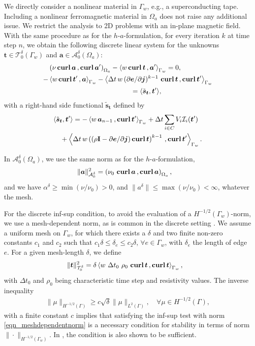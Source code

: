 \documentclass[journal]{IEEEtran}
\renewcommand{\vec}[1]{\boldsymbol{#1}} %
\newcommand{\mat}[1]{\mathbf{#1}} %
\newcommand{\paren}[1]{\left(#1\right)}
\newcommand{\parenangle}[1]{\left\langle#1\right\rangle}
\newcommand{\volInt}[3]{\paren{#1 \, , #2}_{#3}}
\newcommand{\surInt}[3]{\parenangle{#1 \, , #2}_{#3}}
\newcommand{\curl}{\text{\textbf{curl}}\, }
\renewcommand{\a}{\vec a}
\renewcommand{\t}{\vec t}
\newcommand{\e}{\vec e}
\renewcommand{\j}{\vec j}
\newcommand{\Oa}{\Omega_a}
\newcommand{\hafOnly}{$h$-$a$-formulation}
\newcommand{\aspzd}{\mathcal{A}_{0}^{\delta}}
\newcommand{\tspzd}{\mathcal{T}_{0}^{\delta}}
\begin{document}
We directly consider a nonlinear material in $\Gamma_w$, e.g., a superconducting tape. Including a nonlinear ferromagnetic material in $\Oa$ does not raise any additional issue. We restrict the analysis to 2D problems with an in-plane magnetic field. With the same procedure as for the \hafOnly, for every iteration $k$ at time step $n$, we obtain the following discrete linear system for the unknowns $\t\in \tspzd(\Gamma_w)$ and $\a\in \aspzd(\Oa)$:
\begin{equation}\label{oneIterationTASystem}
\begin{aligned}
&\volInt{\nu\, \curl \a}{\curl \a'}{\Oa} - \surInt{w\, \curl \t}{\a'}{\Gamma_w} = 0,\\
 -&\surInt{w\, \curl \t'}{\a}{\Gamma_w}-\surInt{\Delta t\, w\, (\partial\e/\partial\j)^{k-1}\ \curl \t}{\curl \t'}{\Gamma_w}\\
& \qquad \qquad \qquad \qquad \qquad\qquad   = \langle \tilde{\vec s}_{\t}, \t' \rangle,
\end{aligned}
\end{equation}
with a right-hand side functional $\tilde{\vec s}_{\t}$ defined by
\begin{align}
&\langle \tilde{\vec s}_{\t}, \t' \rangle = -\surInt{w\,\a_{n-1}}{\curl \t'}{\Gamma_w} + \Delta t \sum_{i\in C} V_i \mathcal{I}_i(\t')\notag \\
&\quad + \surInt{\Delta t\, w \paren{\paren{\rho \mat I - \partial\e/\partial\j} \curl \t}^{k-1}}{\curl \t'}{\Gamma_w}.
\end{align}

In $\aspzd(\Oa)$, we use the same norm as for the \hafOnly,
\begin{align}
\|\a\|_{\aspzd}^2 &= \volInt{\nu_0\ \curl \a}{\curl \a}{\Oa},
\end{align}
and we have $\alpha^\delta \ge \min(\nu/\nu_0)>0$, and $\|a^\delta\| \le \max(\nu/\nu_0)<\infty$, whatever the mesh.

For the discrete inf-sup condition, to avoid the evaluation of a $H^{-1/2}(\Gamma_w)$-norm, we use a mesh-dependent norm, as is common in the discrete setting \cite{bechet2009stable}. We assume a uniform mesh on $\Gamma_w$, for which there exists a $\delta$ and two finite non-zero constants $c_1$ and $c_2$ such that $c_1 \delta \le \delta_e\le c_2 \delta$, $\forall e\in \Gamma_w$, with $\delta_e$ the length of edge $e$. For a given mesh-length $\delta$, we define
\begin{align}\label{eqn_meshdependentnorm}
\|\t\|_{\tspzd}^2 &= \delta \surInt{w\ \Delta t_0\  \rho_0\ \curl \t}{\curl \t}{\Gamma_w},
\end{align}
with $\Delta t_0$ and $\rho_0$ being characteristic time step and resistivity values. The inverse inequality \cite{el2001stability}
\begin{align}
\|\mu\|_{H^{-1/2}(\Gamma)} \ge c\sqrt{\delta} \|\mu \|_{L^2(\Gamma)}, \quad \forall\mu \in H^{-1/2}(\Gamma),
\end{align}
with a finite constant $c$ implies that satisfying the inf-sup test with norm \eqref{eqn_meshdependentnorm} is a necessary condition for stability in terms of norm $\|\cdot \|_{H^{-1/2}(\Gamma_w)}$. In \cite{pitkaranta1979boundary}, the condition is also shown to be sufficient.
\end{document}
